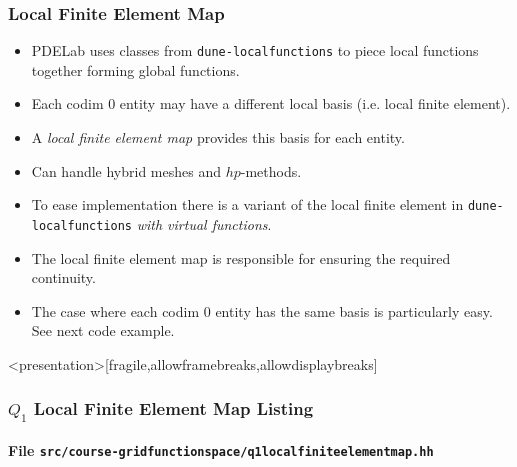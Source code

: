 \begin{frame}
\frametitle{Local Finite Element Map}
\begin{itemize}
\item PDELab uses classes from \lstinline{dune-localfunctions} to 
piece local functions together forming global functions.
\item Each codim 0 entity may have a different local basis (i.e. local finite element).
\item A \textit{local finite element map} provides this basis for each entity.
\item Can handle hybrid meshes and $hp$-methods.
\item To ease implementation there is a variant of the 
local finite element in \lstinline{dune-localfunctions} \textit{with virtual functions}.
\item The local finite element map is responsible for ensuring
the required continuity.
\item The case where each codim 0 entity has the same basis is 
particularly easy. See next code example.
\end{itemize}
\end{frame}

\begin{frame}<presentation>[fragile,allowframebreaks,allowdisplaybreaks]
\frametitle<presentation>{$Q_1$ Local Finite Element Map Listing}
\framesubtitle<presentation>{File \texttt{src/course-gridfunctionspace/q1localfiniteelementmap.hh}}

\end{frame}


